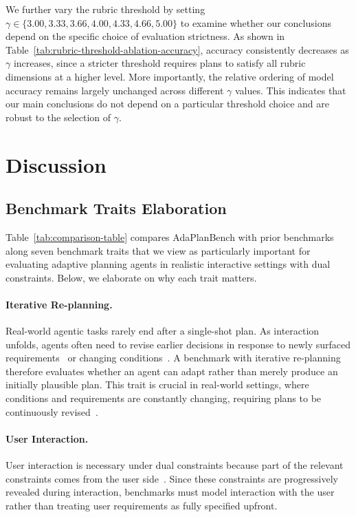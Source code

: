 \documentclass{llmxive}
\providecommand{\bench}[1]{AdaPlanBench}
\begin{document}
We further vary the rubric threshold by setting $\gamma \in \{3.00, 3.33, 3.66, 4.00, 4.33, 4.66, 5.00\}$ to examine whether our conclusions depend on the specific choice of evaluation strictness. 
As shown in Table~\ref{tab:rubric-threshold-ablation-accuracy}, accuracy consistently decreases as $\gamma$ increases, since a stricter threshold requires plans to satisfy all rubric dimensions at a higher level. 
More importantly, the relative ordering of model accuracy remains largely unchanged across different $\gamma$ values. 
This indicates that our main conclusions do not depend on a particular threshold choice and are robust to the selection of $\gamma$.

\section{Discussion}
\label{app:discussion}

\subsection{Benchmark Traits Elaboration}
\label{app:traits-exp}

Table~\ref{tab:comparison-table} compares \bench{} with prior benchmarks along seven benchmark traits that we view as particularly important for evaluating adaptive planning agents in realistic interactive settings with dual constraints.
Below, we elaborate on why each trait matters.

\paragraph{Iterative Re-planning.}
Real-world agentic tasks rarely end after a single-shot plan. As interaction unfolds, agents often need to revise earlier decisions in response to newly surfaced requirements~\citep{tau-bench} or changing conditions~\citep{costbench}. 
A benchmark with iterative re-planning therefore evaluates whether an agent can adapt rather than merely produce an initially plausible plan. 
This trait is crucial in real-world settings, where conditions and requirements are constantly changing, requiring plans to be continuously revised~\citep{xiao2025dynamictheorymindevaluating}.

\paragraph{User Interaction.}
User interaction is necessary under dual constraints because part of the relevant constraints comes from the user side~\citep{FlowBench}. 
Since these constraints are progressively revealed during interaction, benchmarks must model interaction with the user rather than treating user requirements as fully specified upfront.
\end{document}
